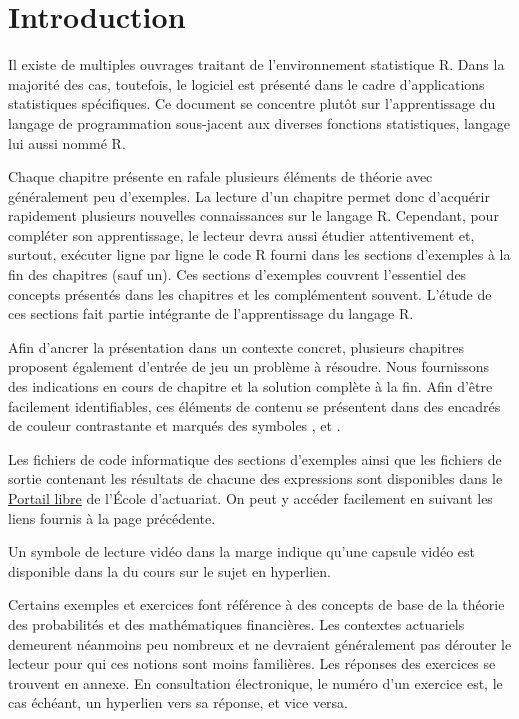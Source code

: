 \chapter*{Introduction}

Il existe de multiples ouvrages traitant de l'environnement
statistique R. Dans la majorité des cas, toutefois, le logiciel est
présenté dans le cadre d'applications statistiques spécifiques. Ce
document se concentre plutôt sur l'apprentissage du langage de
programmation sous-jacent aux diverses fonctions statistiques, langage
lui aussi nommé R.

Chaque chapitre présente en rafale plusieurs éléments de théorie avec
généralement peu d'exemples. La lecture d'un chapitre permet donc
d'acquérir rapidement plusieurs nouvelles connaissances sur le langage
R. Cependant, pour compléter son apprentissage, le lecteur devra aussi
étudier attentivement et, surtout, exécuter ligne par ligne le code R
fourni dans les sections d'exemples à la fin des chapitres (sauf un).
Ces sections d'exemples couvrent l'essentiel des concepts présentés
dans les chapitres et les complémentent souvent. L'étude de ces
sections fait partie intégrante de l'apprentissage du langage R.

Afin d'ancrer la présentation dans un contexte concret, plusieurs
chapitres proposent également d'entrée de jeu un problème à résoudre.
Nous fournissons des indications en cours de chapitre et la solution
complète à la fin. Afin d'être facilement identifiables, ces éléments
de contenu se présentent dans des encadrés de couleur contrastante et
marqués des symboles {\faCogs}, {\faBolt} et {\faLightbulbO}.

Les fichiers de code informatique des sections d'exemples ainsi que
les fichiers de sortie contenant les résultats de chacune des
expressions sont disponibles dans le %
\href{http://libre.act.ulaval.ca/}{Portail libre} %
de l'École d'actuariat. On peut y accéder facilement en suivant les
liens fournis à la page précédente.

Un symbole de lecture vidéo dans la marge indique qu'une capsule vidéo
est disponible dans la %
du cours sur le sujet en hyperlien.

Certains exemples et exercices font référence à des concepts de base
de la théorie des probabilités et des mathématiques financières. Les
contextes actuariels demeurent néanmoins peu nombreux et ne devraient
généralement pas dérouter le lecteur pour qui ces notions sont moins
familières. Les réponses des exercices se trouvent en annexe. En
consultation électronique, le numéro d'un exercice est, le cas
échéant, un hyperlien vers sa réponse, et vice versa.

